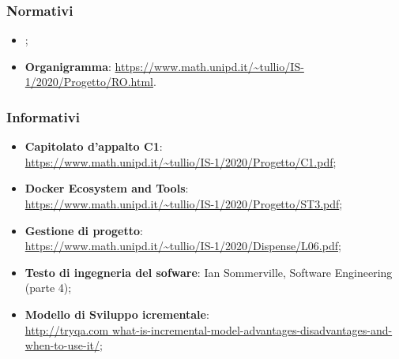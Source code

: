 \subsubsection{Normativi}
\begin{itemize}
    \item \NdPv{};
    \item \textbf{Organigramma}: \url{https://www.math.unipd.it/~tullio/IS-1/2020/Progetto/RO.html}.
\end{itemize}

\subsubsection{Informativi}
\begin{itemize}
    \item \textbf{Capitolato d'appalto C1}:\\
     \url{https://www.math.unipd.it/~tullio/IS-1/2020/Progetto/C1.pdf};
    \item \textbf{Docker Ecosystem and Tools}: \\
    \url{https://www.math.unipd.it/~tullio/IS-1/2020/Progetto/ST3.pdf};
    \item \textbf{Gestione di progetto}:\\
    \url{https://www.math.unipd.it/~tullio/IS-1/2020/Dispense/L06.pdf};
    \item \textbf{Testo di ingegneria del sofware}: Ian Sommerville, Software Engineering (parte 4);
    \item \textbf{Modello di Sviluppo icrementale}: \\
    \url{http://tryqa.com what-is-incremental-model-advantages-disadvantages-and-when-to-use-it/};
\end{itemize}
